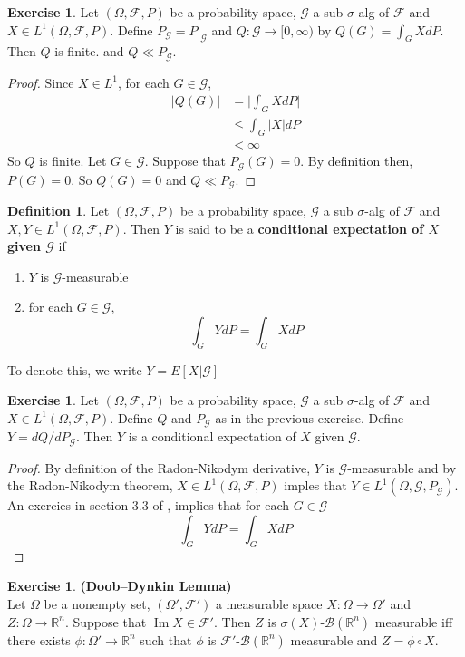\documentclass[12pt]{amsart}
\theoremstyle{definition}
\newtheorem{defn}[definition]{Definition}
\newtheorem{ex}[definition]{Exercise}
\newcommand{\sig}{\sigma}
\newcommand{\Om}{\Omega}
\newcommand{\R}{\mathbb{R}}
\newcommand{\MB}{\mathcal{B}}
\newcommand{\MF}{\mathcal{F}}
\newcommand{\MG}{\mathcal{G}}
\DeclareMathOperator{\Img}{Im}
\begin{document}
	\begin{ex}
	Let $(\Om, \MF, P)$ be a probability space, $\MG$ a sub $\sig$-alg of $\MF$ and $X \in L^1(\Om, \MF, P)$. Define $P_{\MG} = P|_{\MG}$ and $Q: \MG \rightarrow [0,\infty)$ by $Q(G) = \int_G X d P $. Then $Q$ is finite. and $Q \ll P_{\MG}$. 
	\end{ex}	
	
	\begin{proof}
	Since $X \in L^1$, for each $G \in \MG$, 
	\begin{align*}
	|Q(G)|
	&= \bigg| \int_G X dP \bigg| \\
	& \leq \int_G |X| dP \\
	& < \infty
	\end{align*}
	So $Q$ is finite. Let $G \in \MG$. Suppose that $P_{\MG}(G) = 0$. By definition then, $P(G) = 0$. So $Q(G) = 0$ and $Q \ll P_{\MG}$.
	\end{proof}
	
	\begin{defn}
	Let $(\Om, \MF, P)$ be a probability space, $\MG$ a sub $\sig$-alg of $\MF$ and $X, Y \in L^1(\Om, \MF, P)$. Then $Y $ is said to be a \textbf{conditional expectation of $X$ given $\MG$} if 
	\begin{enumerate}
	\item $Y$ is $\MG$-measurable
	\item for each $G \in \MG$, 
	$$\int_G Y dP = \int_G X dP$$ 
	\end{enumerate}	 
	To denote this, we write $Y = E[X|\MG]$
	\end{defn}		
	
	\begin{ex}
	Let $(\Om, \MF, P)$ be a probability space, $\MG$ a sub $\sig$-alg of $\MF$ and $X \in L^1(\Om, \MF, P)$. Define $Q$ and $P_{\MG}$ as in the previous exercise. Define $Y = dQ/dP_{\MG}$. Then $Y$ is a conditional expectation of $X$ given $\MG$.
	\end{ex}
	
	\begin{proof}
		By definition of the Radon-Nikodym derivative, $Y$ is $\MG$-measurable and by the Radon-Nikodym theorem, $X \in L^1(\Om, \MF, P)$ imples that $Y \in L^1(\Om, \MG, P_{\MG})$. An exercies in section $3.3$ of \cite{imi}, implies that for each $G \in \MG$ $$\int_G Y dP = \int_G X dP$$
	\end{proof}	
	
	
	
	\begin{ex}\textbf{(Doob–Dynkin Lemma)} \\
	Let $\Om$ be a nonempty set, $(\Om', \MF')$ a measurable space $X: \Om \rightarrow \Om'$ and $Z: \Om \rightarrow \R^n$. Suppose that $\Img X \in \MF'$. Then $Z$ is $\sig(X)$-$\MB(\R^n)$ measurable iff there exists $\phi:\Om' \rightarrow \R^n$ such that $\phi$ is $\MF'$-$\MB(\R^n)$ measurable and $Z = \phi \circ X$.
	\end{ex}
	
\end{document}
